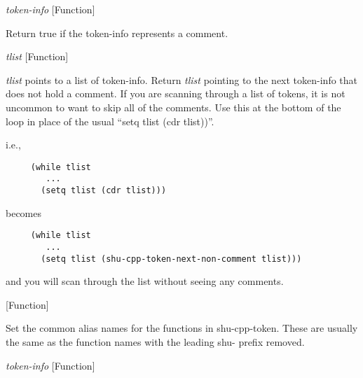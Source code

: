 \vspace{1em}
\noindent
{}
\usebox{\funcname}\emph{token-info}
 \hfill [Function]

\begin{doc-string}
Return true if the token-info represents a comment.
\end{doc-string}

\vspace{1em}
\noindent
{}
\usebox{\funcname}\emph{tlist}
 \hfill [Function]

\begin{doc-string}
\emph{tlist} points to a list of token-info.  Return \emph{tlist} pointing to the next
token-info that does not hold a comment.  If you are scanning through a list
of tokens, it is not uncommon to want to skip all of the comments.  Use this
at the bottom of the loop in place of the usual ``setq tlist (cdr tlist))''.

i.e.,

\small{\begin{verbatim}
     (while tlist
        ...
       (setq tlist (cdr tlist)))
\end{verbatim}}

becomes

\small{\begin{verbatim}
     (while tlist
        ...
       (setq tlist (shu-cpp-token-next-non-comment tlist)))
\end{verbatim}}

and you will scan through the list without seeing any comments.
\end{doc-string}

\vspace{1em}
\noindent
{}
\usebox{\funcname}
 \hfill [Function]

\begin{doc-string}
Set the common alias names for the functions in shu-cpp-token.
These are usually the same as the function names with the leading
shu- prefix removed.
\end{doc-string}

\vspace{1em}
\noindent
{}
\usebox{\funcname}\emph{token-info}
 \hfill [Function]
\hspace*{\wd\funcname}

